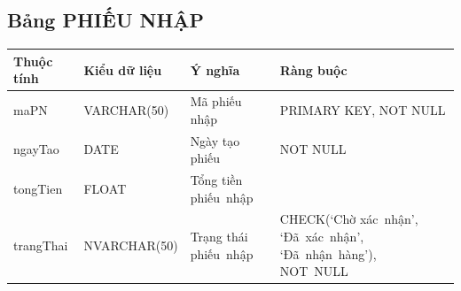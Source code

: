 \documentclass[a4paper,12pt]{report}
\begin{document}
\subsection{Bảng PHIẾU NHẬP}
\noindent
\begin{center}
    \begin{tabular}{|>{\centering\arraybackslash}p{3cm}|
        >{\centering\arraybackslash}p{4cm}|
        >{\centering\arraybackslash}p{4cm}|
        >{\centering\arraybackslash}p{4cm}|}
        \hline
        \textbf{Thuộc tính}                                                                                                               &
        \textbf{Kiểu dữ liệu}                                                                                                                             &
        \textbf{Ý nghĩa}                                                                                                 &
        \textbf{Ràng buộc}                                                                                                         \\
        \hline
        maPN &  VARCHAR(50)  & Mã phiếu nhập & PRIMARY KEY, NOT NULL \\
        \hline
        ngayTao &  DATE  & Ngày tạo phiếu & NOT NULL \\                                                                                                                          
        \hline
        tongTien & FLOAT & Tổng tiền phiếu~nhập & \\                                                                                                                          
        \hline
        trangThai &  NVARCHAR(50)  & Trạng thái phiếu~nhập & CHECK(‘Chờ xác~nhận’, ‘Đã~xác~nhận’, ‘Đã~nhận~hàng’), NOT~NULL \\
        \hline
    \end{tabular}
\end{center}
\end{document}
